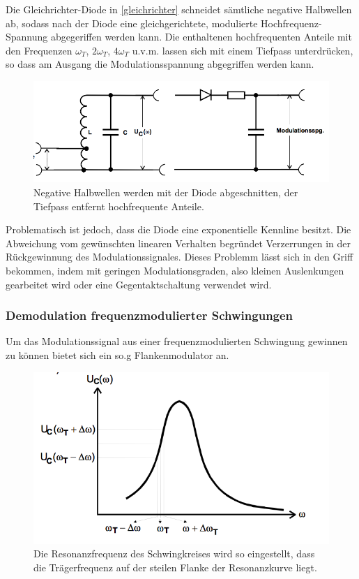 Die Gleichrichter-Diode in \autoref{gleichrichter} schneidet sämtliche negative Halbwellen ab, sodass nach der Diode eine gleichgerichtete, modulierte Hochfrequenz-Spannung abgegeriffen werden kann. Die enthaltenen hochfrequenten Anteile mit den Frequenzen $\omega_T$, $2\omega_T$,
$4\omega_T$ u.v.m. lassen sich mit einem Tiefpass unterdrücken, so dass am Ausgang die Modulationsspannung abgegriffen werden kann.

\begin{figure}
	\centering
	\includegraphics[width=\textwidth]{img/Abb12.png}
	\caption{Negative Halbwellen werden mit der Diode abgeschnitten, der Tiefpass entfernt hochfrequente Anteile. \cite{FP}}
	\label{gleichrichter}
\end{figure}

Problematisch ist jedoch, dass die Diode eine exponentielle Kennline besitzt. Die Abweichung vom gewünschten linearen Verhalten begründet Verzerrungen in der Rückgewinnung des Modulationssignales. Dieses Problemm lässt sich in den Griff bekommen, indem mit geringen Modulationsgraden, also kleinen Auslenkungen gearbeitet wird oder eine Gegentaktschaltung verwendet wird.

\subsubsection{Demodulation frequenzmodulierter Schwingungen}
Um das Modulationssignal aus einer frequenzmodulierten Schwingung gewinnen zu können bietet sich ein so.g Flankenmodulator an.

\begin{figure}
	\centering
	\includegraphics[width=\textwidth]{img/Abb13.png}
	\caption{Die Resonanzfrequenz des Schwingkreises wird so eingestellt, dass die Trägerfrequenz auf der steilen Flanke der Resonanzkurve liegt. \cite{FP}}
	\label{resonanzkurve}
\end{figure}

